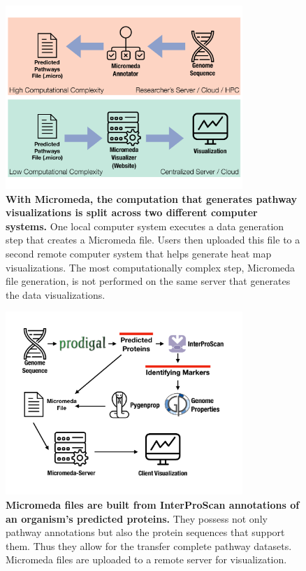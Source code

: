\begin{figure}[!ht]
  \centering
	\includegraphics[width=0.8\textwidth]{media/micromeda-file-generation.pdf}
	 \caption[With Micromeda, the computation that generates pathway visualizations 
is split across two different computer systems.]{\textbf{With Micromeda, the 
computation that generates pathway visualizations is split across two different 
computer systems.} One local computer system executes a data generation step 
that creates a Micromeda file. Users then uploaded this file to a second remote 
computer system that helps generate heat map visualizations. The most 
computationally complex step, Micromeda file generation, is not performed on the 
same server that generates the data visualizations.}
	 \label{fig:micromeda-file-generation}
\end{figure}

\begin{figure}[!ht]
  \centering
	\includegraphics[width=0.8\textwidth]{media/how-micromeda-files-are-built.pdf}
	 \caption[Micromeda files are built from InterProScan annotations of an 
organism's predicted proteins.]{\textbf{Micromeda files are built from 
InterProScan annotations of an organism's predicted proteins.} They possess not 
only pathway annotations but also the protein sequences that support them. Thus 
they allow for the transfer complete pathway datasets. Micromeda files are 
uploaded to a remote server for visualization.}
	 \label{fig:micromeda-file-building-and-use}
\end{figure}

